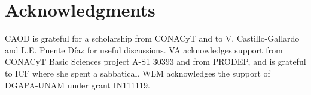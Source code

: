 \documentclass[review,sort&compress]{cas-sc}
\begin{document}
\section*{Acknowledgments}
\label{sec:acknowledgments}
CAOD is grateful for a scholarship from CONACyT and to
V. Castillo-Gallardo and L.E. Puente Díaz for useful discussions. VA acknowledges support
from CONACyT Basic Sciences project A-S1 30393 and from PRODEP, and is
grateful to ICF where she spent a sabbatical.
WLM acknowledges the support of DGAPA-UNAM under grant
IN111119.

\printcredits



\end{document}
